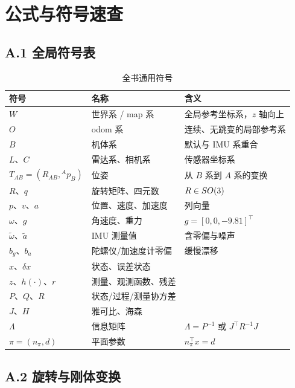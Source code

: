 \chapter{公式与符号速查}

\section*{A.1 全局符号表}

\begin{table}[htbp]
  \centering
  \caption{全书通用符号}\label{tab:a-symbols}
  \small
  \begin{tabular}{llp{7.2cm}}
    \toprule
    符号 & 名称 & 含义 \\
    \midrule
    $W$ & 世界系 / map 系 & 全局参考坐标系，$z$ 轴向上 \\
    $O$ & odom 系 & 连续、无跳变的局部参考系 \\
    $B$ & 机体系 & 默认与 IMU 系重合 \\
    $L$、$C$ & 雷达系、相机系 & 传感器坐标系 \\
    $T_{AB}=(R_{AB},{}^{A}p_B)$ & 位姿 & 从 $B$ 系到 $A$ 系的变换 \\
    $R$、$q$ & 旋转矩阵、四元数 & $R\in SO(3)$ \\
    $p$、$v$、$a$ & 位置、速度、加速度 & 列向量 \\
    $\omega$、$g$ & 角速度、重力 & $g=[0,0,-9.81]^{\top}$ \\
    $\tilde{\omega}$、$\tilde{a}$ & IMU 测量值 & 含零偏与噪声 \\
    $b_g$、$b_a$ & 陀螺仪/加速度计零偏 & 缓慢漂移 \\
    $x$、$\delta x$ & 状态、误差状态 & \\
    $z$、$h(\cdot)$、$r$ & 测量、观测函数、残差 & \\
    $P$、$Q$、$R$ & 状态/过程/测量协方差 & \\
    $J$、$H$ & 雅可比、海森 & \\
    $\Lambda$ & 信息矩阵 & $\Lambda=P^{-1}$ 或 $J^{\top}R^{-1}J$ \\
    $\pi=(n_\pi,d)$ & 平面参数 & $n_\pi^{\top}x=d$ \\
    \bottomrule
  \end{tabular}
\end{table}

\section*{A.2 旋转与刚体变换}

